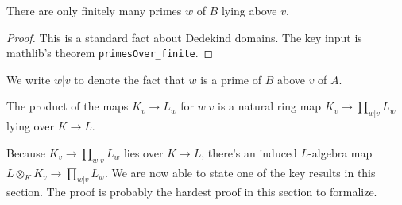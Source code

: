 \begin{lemma}
  \label{IsDedekindDomain.HeightOneSpectrum.Extension.finite}
  \leanok
  There are only finitely many primes $w$ of $B$ lying above $v$.
\end{lemma}
\begin{proof}
  \leanok
  This is a standard fact about Dedekind domains. The key input is
  mathlib's theorem {\tt primesOver\_finite}.
\end{proof}

We write $w|v$ to denote the fact that $w$ is a prime of $B$ above $v$ of $A$.

\begin{definition}
  \label{IsDedekindDomain.HeightOneSpectrum.adicCompletionComapSemialgHom'}
  \leanok
  The product of the maps $K_v\to L_w$ for $w|v$ is a natural ring map $K_v\to\prod_{w|v}L_w$
  lying over $K\to L$.
\end{definition}

Because $K_v\to\prod_{w|v}L_w$ lies over $K\to L$, there's an induced $L$-algebra
map $L\otimes_KK_v\to\prod_{w|v}L_w$. We are now able to state one of the key results
in this section. The proof is probably the hardest proof
in this section to formalize.

